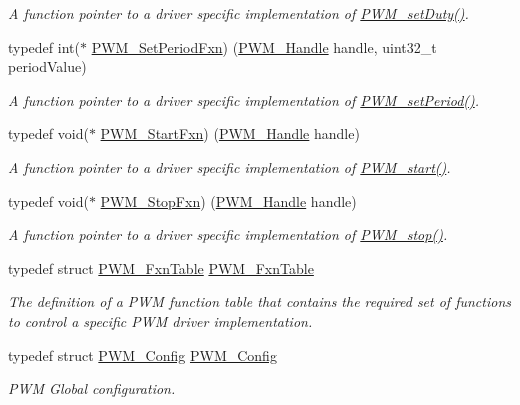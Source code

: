 \begin{DoxyCompactItemize}
\begin{DoxyCompactList}\small\item\em A function pointer to a driver specific implementation of \hyperlink{_p_w_m_8h_a90979a3b8d525f266c2b82e012f68cee}{P\+W\+M\+\_\+set\+Duty()}. \end{DoxyCompactList}\item 
typedef int($\ast$ \hyperlink{_p_w_m_8h_a11f62a9fd14169856c477ce2fbe17b6f}{P\+W\+M\+\_\+\+Set\+Period\+Fxn}) (\hyperlink{_p_w_m_8h_afdefc765f42bbad4dca246fda6e1354b}{P\+W\+M\+\_\+\+Handle} handle, uint32\+\_\+t period\+Value)
\begin{DoxyCompactList}\small\item\em A function pointer to a driver specific implementation of \hyperlink{_p_w_m_8h_ae40714354f46dd6d30dbfb14473c73e0}{P\+W\+M\+\_\+set\+Period()}. \end{DoxyCompactList}\item 
typedef void($\ast$ \hyperlink{_p_w_m_8h_af0a392fb66c104f9d60e80e023dd3b89}{P\+W\+M\+\_\+\+Start\+Fxn}) (\hyperlink{_p_w_m_8h_afdefc765f42bbad4dca246fda6e1354b}{P\+W\+M\+\_\+\+Handle} handle)
\begin{DoxyCompactList}\small\item\em A function pointer to a driver specific implementation of \hyperlink{_p_w_m_8h_aa1bd0cc3f0fa52879422fca74d254378}{P\+W\+M\+\_\+start()}. \end{DoxyCompactList}\item 
typedef void($\ast$ \hyperlink{_p_w_m_8h_aff8ad682f40a810ecf03824e8e190087}{P\+W\+M\+\_\+\+Stop\+Fxn}) (\hyperlink{_p_w_m_8h_afdefc765f42bbad4dca246fda6e1354b}{P\+W\+M\+\_\+\+Handle} handle)
\begin{DoxyCompactList}\small\item\em A function pointer to a driver specific implementation of \hyperlink{_p_w_m_8h_ae83a4cd327a07d6037ff1a8d72fb3ae6}{P\+W\+M\+\_\+stop()}. \end{DoxyCompactList}\item 
typedef struct \hyperlink{struct_p_w_m___fxn_table}{P\+W\+M\+\_\+\+Fxn\+Table} \hyperlink{_p_w_m_8h_a05890cc4f17c4343ff0ee612561fe267}{P\+W\+M\+\_\+\+Fxn\+Table}
\begin{DoxyCompactList}\small\item\em The definition of a P\+W\+M function table that contains the required set of functions to control a specific P\+W\+M driver implementation. \end{DoxyCompactList}\item 
typedef struct \hyperlink{struct_p_w_m___config}{P\+W\+M\+\_\+\+Config} \hyperlink{_p_w_m_8h_a007c9e36d0b1afcff70e1f2201845236}{P\+W\+M\+\_\+\+Config}
\begin{DoxyCompactList}\small\item\em P\+W\+M Global configuration. \end{DoxyCompactList}\end{DoxyCompactItemize}
